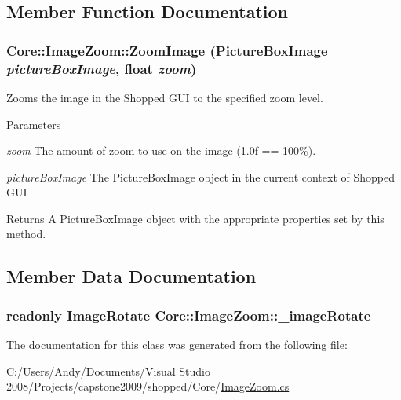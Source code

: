 \subsection{Member Function Documentation}
\hypertarget{class_core_1_1_image_zoom_acf72703a1e7bbe863f408a3d509055f8}{
\subsubsection[{ZoomImage}]{ Core::ImageZoom::ZoomImage ({\bf PictureBoxImage} {\em pictureBoxImage}, \/  float {\em zoom})}}
\label{class_core_1_1_image_zoom_acf72703a1e7bbe863f408a3d509055f8}
Zooms the image in the Shopped GUI to the specified zoom level.


\begin{DoxyParams}{Parameters}
\item[{\em zoom}]The amount of zoom to use on the image (1.0f == 100\%). \item[{\em pictureBoxImage}]The PictureBoxImage object in the current context of Shopped GUI \end{DoxyParams}
\begin{DoxyReturn}{Returns}
A PictureBoxImage object with the appropriate properties set by this method. 
\end{DoxyReturn}


\subsection{Member Data Documentation}
\hypertarget{class_core_1_1_image_zoom_ac172e8d206911a595df13e8711b3fed7}{
\subsubsection[{\_\-imageRotate}]{\setlength{\rightskip}{0pt plus 5cm}readonly {\bf ImageRotate} {\bf Core::ImageZoom::\_\-imageRotate}}}
\label{class_core_1_1_image_zoom_ac172e8d206911a595df13e8711b3fed7}


The documentation for this class was generated from the following file:\begin{DoxyCompactItemize}
\item 
C:/Users/Andy/Documents/Visual Studio 2008/Projects/capstone2009/shopped/Core/\hyperlink{_image_zoom_8cs}{ImageZoom.cs}\end{DoxyCompactItemize}
